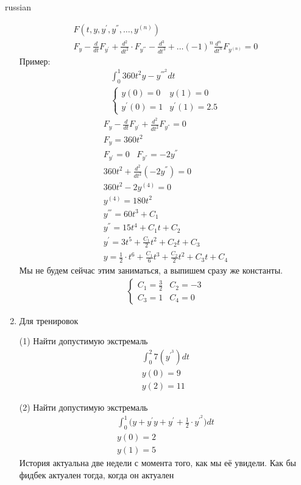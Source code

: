 \documentclass{article}
\begin{document}
\begin{otherlanguage*}{russian}
\begin{enumerate}
\begin{align}
F(t, y, y^{'}, y^{''}, \ldots, y^{(n)} ) \\
F_y - \frac{d}{dt} F_{y^{'}} + \frac{d^2}{dt^2} \cdot F_{y^{'''}} - \frac{d^3}{dt^3} + \ldots (-1) ^ n \frac{d^n}{dt^n} F_{y^{(n)}} = 0 
\end{align}
Пример: 
\begin{align}
\int_0^1 360 t^2 y - y^{'''^2} dt \\
\begin{cases}
y(0) = 0 & y(1) = 0 \\ 
y^{'} (0) = 1 & y^{'} (1) = 2.5 
\end{cases}
\end{align}
\begin{align}
F_y - \frac{d}{dt} F_{y^{'}} + \frac{d^2}{dt^2} F_{y^{''}} = 0 \\
F_y = 360 t ^ 2 \\
F_{y^{'}} = 0 \,\,\,\,\, F_{y^{''}} = - 2 y^{''} \\
360 t ^ 2 + \frac{d^2}{dt^2} (-2 y^{''}) = 0 \\
360 t ^2 - 2 y^{(4)} = 0 \\
y^{(4)} = 180 t ^ 2 \\
y^{'''} = 60 t ^3 + C_1 \\
y^{''} = 15 t ^ 4 + C_1 t + C_2 \\
y^{'} = 3t^5 + \frac{C_1}{2} t^2 + C_2 t + C_3 \\
y = \frac{1}{2} \cdot t ^ 6 + \frac{C_1}{6} t^3 + \frac{C_2}{2} t^2 + C_3 t + C_4 
\end{align}
Мы не будем сейчас этим заниматься, а выпишем сразу же константы. 
\begin{align}
\begin{cases}
C_1 = \frac{3}{2} & C_2 = - 3\\
C_3 = 1 & C_4 = 0 
\end{cases}
\end{align}

\item Для тренировок 

(1) Найти допустимую экстремаль
\begin{align}
\int_0^2 7(y^{'^{3}}) dt \\
y(0) = 9\\
y(2) = 11
\end{align}

(2) Найти допустимую экстремаль 
\begin{align}
\int_0^1 \Big( y + y^{'} y + y^{'} + \frac{1}{2} \cdot y^{'^{2}} \Big) dt \\
y(0) = 2 \\
y(1) = 5  
\end{align}
История актуальна две недели с момента того, как мы её увидели. Как бы фидбек актуален тогда, когда он актуален 
\end{enumerate}

\end{otherlanguage*}
\end{document}
